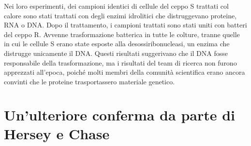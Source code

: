 \documentclass[11pt]{report}
\begin{document}
	Nei loro esperimenti, dei campioni identici di cellule del ceppo S trattati col calore sono stati trattati con degli enzimi idrolitici che distruggevano proteine, RNA o DNA. Dopo il trattamento, i campioni trattati sono stati uniti con batteri del ceppo R. Avvenne trasformazione batterica in tutte le colture, tranne quelle in cui le cellule S erano state esposte alla desossiribonucleasi, un enzima che distrugge unicamente il DNA.\cite{avery1944studies} Questi risultati suggerivano che il DNA fosse responsabile della trasformazione, ma i risultati del team di ricerca non furono apprezzati all'epoca, poiché molti membri della comunità scientifica erano ancora convinti che le proteine trasportassero materiale genetico.
	
	\section{Un'ulteriore conferma da parte di Hersey e Chase}
	
\end{document}
